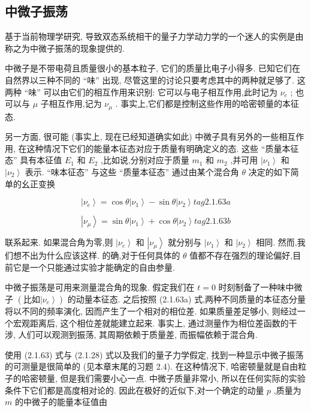 \documentclass[lang=cn,newtx,10pt,scheme=chinese,thmcnt=section]{elegantbook}
\begin{document}
\subsection*{中微子振荡}

基于当前物理学研究, 导致双态系统相干的量子力学动力学的一个迷人的实例是由称之为中微子振荡的现象提供的.

中微子是不带电荷且质量很小的基本粒子, 它们的质量比电子小得多. 已知它们在自然界以三种不同的 “味” 出现, 尽管这里的讨论只要考虑其中的两种就足够了. 这两种 “味” 可以由它们的相互作用来识别: 它可以与电子相互作用,此时记为 ${\nu }_{e}$ ; 也可以与 $\mu$ 子相互作用,记为 ${\nu }_{\mu }$ . 事实上,它们都是控制这些作用的哈密顿量的本征态.

另一方面, 很可能 (事实上, 现在已经知道确实如此) 中微子具有另外的一些相互作用, 在这种情况下它们的能量本征态对应于质量有明确定义的态. 这些 “质量本征态” 具有本征值 ${E}_{1}$ 和 ${E}_{2}$ ,比如说,分别对应于质量 ${m}_{1}$ 和 ${m}_{2}$ ,并可用 $\left| {\nu }_{1}\right\rangle$ 和 $\left| {\nu }_{2}\right\rangle$ 表示. “味本征态” 与这些 “质量本征态” 通过由某个混合角 $\theta$ 决定的如下简单的幺正变换

$$
\left| {\nu }_{e}\right\rangle = \cos \theta \left| {\nu }_{1}\right\rangle - \sin \theta \left| {\nu }_{2}\right\rangle tag{2.1.63a}
$$

$$
\left| {\nu }_{\mu }\right\rangle = \sin \theta \left| {\nu }_{1}\right\rangle + \cos \theta \left| {\nu }_{2}\right\rangle tag{2.1.63b}
$$

联系起来. 如果混合角为零,则 $\left| {\nu }_{e}\right\rangle$ 和 $\left| {\nu }_{\mu }\right\rangle$ 就分别与 $\left| {\nu }_{1}\right\rangle$ 和 $\left| {\nu }_{2}\right\rangle$ 相同. 然而,我们想不出为什么应该这样. 的确,对于任何具体的 $\theta$ 值都不存在强烈的理论偏好,目前它是一个只能通过实验才能确定的自由参量.

中微子振荡是可用来测量混合角的现象. 假定我们在 $t = 0$ 时刻制备了一种味中微子 $\left( {\text{比如}\left| {\nu }_{e}\right\rangle }\right)$ 的动量本征态. 之后按照 (2.1.63a) 式,两种不同质量的本征态分量将以不同的频率演化, 因而产生了一个相对的相位差. 如果质量差足够小, 则经过一个宏观距离后, 这个相位差就能建立起来. 事实上, 通过测量作为相位差函数的干涉, 人们可以观测到振荡, 其周期依赖于质量差, 而振幅依赖于混合角.

使用 (2.1.63) 式与 (2.1.28) 式以及我们的量子力学假定, 找到一种显示中微子振荡的可测量是很简单的 (见本章末尾的习题 2.4). 在这种情况下, 哈密顿量就是自由粒子的哈密顿量, 但是我们需要小心一点. 中微子质量非常小, 所以在任何实际的实验条件下它们都是高度相对论的. 因此在极好的近似下,对一个确定的动量 $p$ ,质量为 $m$ 的中微子的能量本征值由
\end{document}
